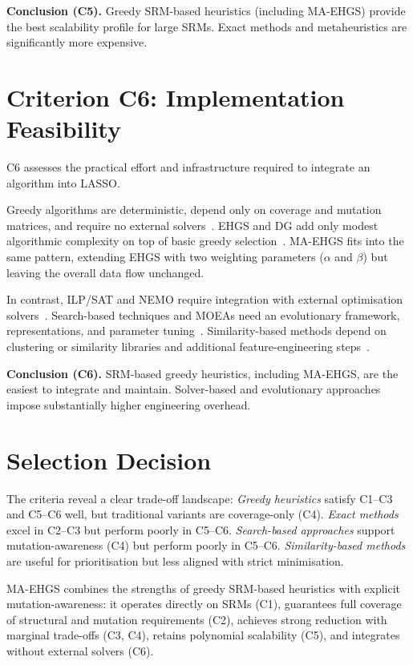 \textbf{Conclusion (C5).} Greedy SRM-based heuristics (including MA-EHGS) provide the best scalability profile for large SRMs. Exact methods and metaheuristics are significantly more expensive.

\section{Criterion C6: Implementation Feasibility}

C6 assesses the practical effort and infrastructure required to integrate an algorithm into LASSO.

Greedy algorithms are deterministic, depend only on coverage and mutation matrices, and require no external solvers~\cite{yoo2012,noemmer2020,jehan2023}. EHGS and DG add only modest algorithmic complexity on top of basic greedy selection~\cite{tallam2005,gladston2015}. MA-EHGS fits into the same pattern, extending EHGS with two weighting parameters ($\alpha$ and $\beta$) but leaving the overall data flow unchanged.

In contrast, ILP/SAT and NEMO require integration with external optimisation solvers~\cite{elbaum2002,yoo2012,lin2018}. Search-based techniques and MOEAs need an evolutionary framework, representations, and parameter tuning~\cite{yoo2012,khan2020,wei2017}. Similarity-based methods depend on clustering or similarity libraries and additional feature-engineering steps~\cite{bach2017}.

\textbf{Conclusion (C6).} SRM-based greedy heuristics, including MA-EHGS, are the easiest to integrate and maintain. Solver-based and evolutionary approaches impose substantially higher engineering overhead.

\section{Selection Decision}

The criteria reveal a clear trade-off landscape: \emph{Greedy heuristics} satisfy C1--C3 and C5--C6 well, but traditional variants are coverage-only (C4). \emph{Exact methods} excel in C2--C3 but perform poorly in C5--C6. \emph{Search-based approaches} support mutation-awareness (C4) but perform poorly in C5--C6. \emph{Similarity-based methods} are useful for prioritisation but less aligned with strict minimisation.

MA-EHGS combines the strengths of greedy SRM-based heuristics with explicit mutation-awareness: it operates directly on SRMs (C1), guarantees full coverage of structural and mutation requirements (C2), achieves strong reduction with marginal trade-offs (C3, C4), retains polynomial scalability (C5), and integrates without external solvers (C6).

